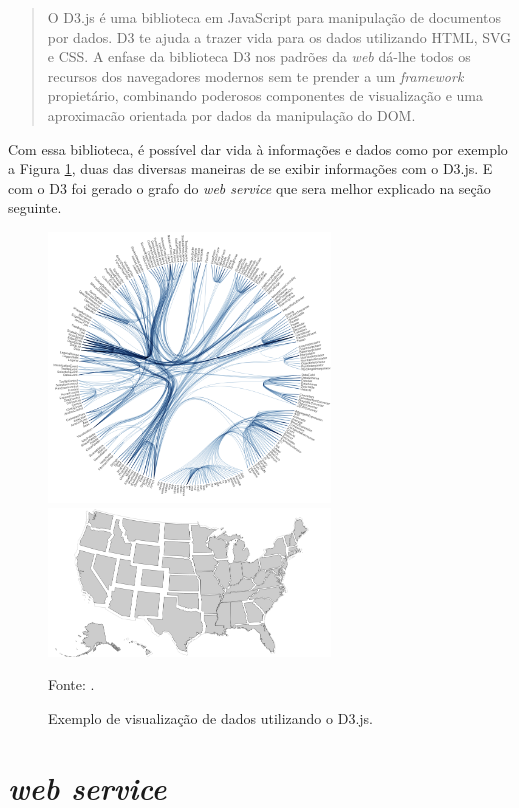 \begin{quote}
O D3.js é uma biblioteca em JavaScript para manipulação de documentos por dados. D3 te ajuda a trazer vida para os dados utilizando HTML, SVG e CSS. A enfase da biblioteca D3 nos padrões da \textit{web} dá-lhe todos os recursos dos navegadores modernos sem te prender a um \textit{framework} propietário, combinando poderosos componentes de visualização e uma aproximacão orientada por dados da manipulação do DOM.
\cite[tradução nossa]{d3js}
\end{quote}


Com essa biblioteca, é possível dar vida à informações e dados como por exemplo a Figura \ref{fig:d3}, duas das diversas maneiras de se exibir informações com o D3.js. E com o D3 foi gerado o grafo do \textit{web service} que sera melhor explicado na seção seguinte.

\begin{figure}[H]
	\caption{Exemplo de visualização de dados utilizando o D3.js.}
	\begin{center}
		\includegraphics[width=7.5cm]{imagens/d3_1.png}%
		\hspace{1cm}%
		\includegraphics[width=7.5cm]{imagens/d3_2.PNG}%
	\end{center}
	\small{Fonte: \cite{d3js}.}
	\label{fig:d3}
\end{figure}


\section{\textit{web service}}
\label{chap:web}

